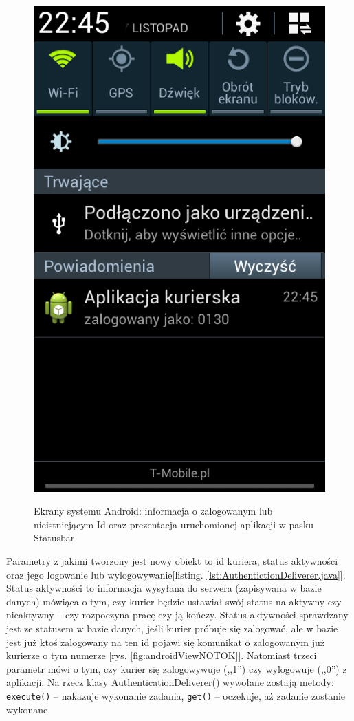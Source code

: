 \documentclass[eng,printmode,oneside]{mgr}
\begin{document}
\begin{figure}
{\includegraphics[height=0.35\textheight]{andBarZal.png}
\label{fig:androidViewtask}
}
\caption{Ekrany systemu Android: informacja o zalogowanym lub nieistniejącym
Id oraz prezentacja uruchomionej aplikacji w pasku Statusbar}
\end{figure}

Parametry z jakimi tworzony jest
nowy obiekt to id kuriera, status aktywności oraz jego logowanie lub
wylogowywanie[listing. \ref{lst:AuthentictionDeliverer.java}]. Status aktywności to
informacja wysyłana do serwera (zapisywana w bazie danych) mówiąca o tym, czy kurier będzie ustawiał swój status na aktywny
czy nieaktywny -- czy rozpoczyna pracę czy ją kończy. Status aktywności
sprawdzany jest ze statusem w bazie danych, jeśli kurier próbuje się zalogować,
ale w bazie jest już ktoś zalogowany na ten id pojawi się komunikat o
zalogowanym już kurierze o tym numerze [rys. \ref{fig:androidViewNOTOK}].
Natomiast trzeci parametr mówi o tym, czy kurier się zalogowywuje (,,1'') czy
wylogowuje (,,0'') z aplikacji. Na rzecz klasy AuthenticationDeliverer()
wywołane zostają metody:
\texttt{execute()} -- nakazuje wykonanie zadania, \texttt{get()} -- oczekuje, aż
zadanie zostanie wykonane.
\end{document}
